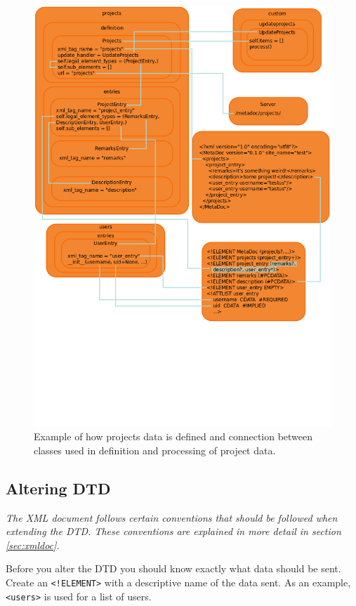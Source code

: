 \begin{figure}[h!]
    \includegraphics[width=\textwidth]{img/example}
    \caption{Example of how projects data is defined and connection between
    classes used in definition and processing of project data.}
    \label{fig:connection_example}
\end{figure}

\subsection{Altering DTD}
\textit{The XML document follows certain conventions that should be followed when
extending the DTD. These conventions are explained in more detail in section
\ref{sec:xmldoc}.}

Before you alter the DTD you should know exactly what data should be sent.
Create an \texttt{<!ELEMENT>} with a descriptive name of the data sent. As an
example, \texttt{<users>} is used for a list of users. 

